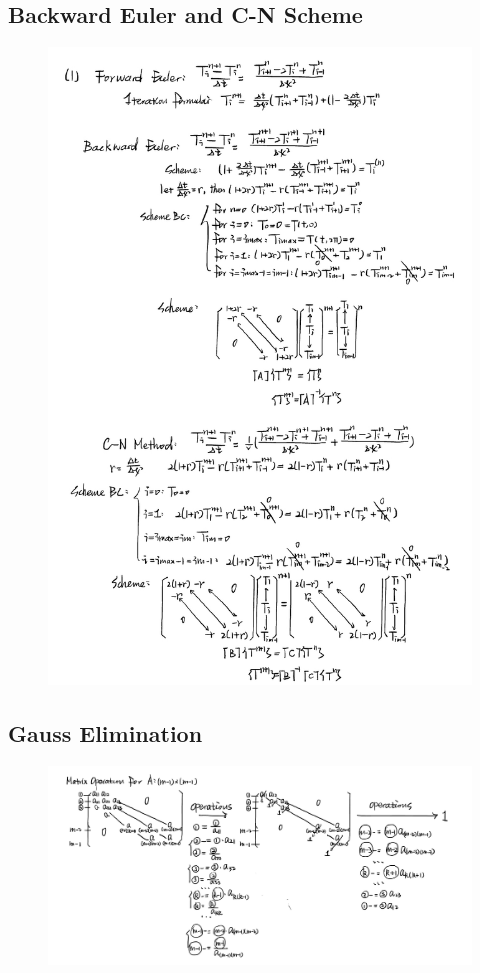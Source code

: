 \documentclass[12pt]{article}
\begin{document}
\subsection{Backward Euler and C-N Scheme}
\begin{figure}[H] 
\centering 
\includegraphics[scale=0.5]{Schemes.jpg} 
\end{figure}




\subsection{Gauss Elimination}
\begin{figure}[H] 
\centering 
\includegraphics[scale=0.2]{Gauss Elimination.jpg} 
\end{figure}
\end{document}
